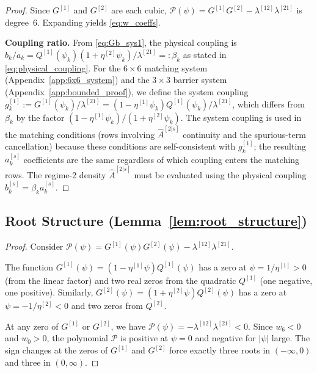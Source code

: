 \documentclass[11pt,a4paper]{article}
\numberwithin{equation}{section}
\begin{document}
\begin{appendices}
\begin{proof}
Since $G^{[1]}$ and $G^{[2]}$ are each cubic, $\mathcal{P}(\psi) = G^{[1]}G^{[2]} - \lambda^{[12]}\lambda^{[21]}$ is degree~6. Expanding yields \eqref{eq:w_coeffs}.

\medskip\noindent\textbf{Coupling ratio.} From \eqref{eq:Gb_sys1}, the physical coupling is $b_k/a_k = Q^{[1]}(\psi_k)(1+\eta^{[2]}\psi_k) / \lambda^{[21]} =: \beta_k$ as stated in \eqref{eq:physical_coupling}. For the $6\times 6$ matching system (Appendix~\ref{app:6x6_system}) and the $3 \times 3$ barrier system (Appendix~\ref{app:bounded_proof}), we define the system coupling $g^{[1]}_k := G^{[1]}(\psi_k)/\lambda^{[21]} = (1-\eta^{[1]}\psi_k)Q^{[1]}(\psi_k)/\lambda^{[21]}$, which differs from $\beta_k$ by the factor $(1-\eta^{[1]}\psi_k)/(1+\eta^{[2]}\psi_k)$. The system coupling is used in the matching conditions (rows involving $\hat{A}^{[2|s]}$ continuity and the spurious-term cancellation) because these conditions are self-consistent with $g^{[1]}_k$; the resulting $a^{[s]}_k$ coefficients are the same regardless of which coupling enters the matching rows. The regime-2 density $\hat{A}^{[2|s]}$ must be evaluated using the physical coupling $b^{[s]}_k = \beta_k a^{[s]}_k$.
\end{proof}


\subsection{Root Structure (Lemma~\ref{lem:root_structure})}\label{app:root_structure}

\begin{proof}
Consider $\mathcal{P}(\psi) = G^{[1]}(\psi)G^{[2]}(\psi) - \lambda^{[12]}\lambda^{[21]}$.

The function $G^{[1]}(\psi) = (1-\eta^{[1]}\psi)Q^{[1]}(\psi)$ has a zero at $\psi = 1/\eta^{[1]} > 0$ (from the linear factor) and two real zeros from the quadratic $Q^{[1]}$ (one negative, one positive). Similarly, $G^{[2]}(\psi) = (1+\eta^{[2]}\psi)Q^{[2]}(\psi)$ has a zero at $\psi = -1/\eta^{[2]} < 0$ and two zeros from $Q^{[2]}$.

At any zero of $G^{[1]}$ or $G^{[2]}$, we have $\mathcal{P}(\psi) = -\lambda^{[12]}\lambda^{[21]} < 0$. Since $w_6 < 0$ and $w_0 > 0$, the polynomial $\mathcal{P}$ is positive at $\psi = 0$ and negative for $|\psi|$ large. The sign changes at the zeros of $G^{[1]}$ and $G^{[2]}$ force exactly three roots in $(-\infty, 0)$ and three in $(0, \infty)$.


\end{proof}
\end{appendices}
\end{document}
